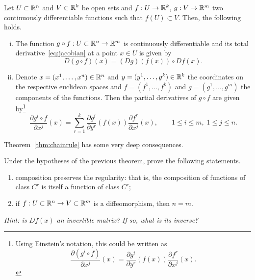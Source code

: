 \begin{theorem}\label{thm:chainrule}
  Let $U\subset\mathbb{R}^n$ and $V\subset\mathbb{R}^k$ be open sets and $f: U \to \mathbb{R}^k$, $g: V\to\mathbb{R}^m$ two continuously differentiable functions such that $f(U)\subset V$.
  Then, the following holds.
  \begin{enumerate}[(i)]
    \item\label{thm:chainrule1} The function $g\circ f: U\subset\mathbb{R}^n \to\mathbb{R}^m$ is continuously differentiable and its total derivative~\eqref{eq:jacobian} at a point $x\in U$ is given by
    \begin{equation}
      D(g\circ f)(x) = (Dg)(f(x)) \circ Df(x).
    \end{equation}
    \item\label{thm:chainrule2} Denote $x=(x^1, \ldots, x^n)\in\mathbb{R}^n$ and $y=(y^1,\ldots,y^k)\in\mathbb{R}^k$ the coordinates on the respective euclidean spaces and $f=(f^1,\ldots,f^k)$ and $g=(g^1,\ldots,g^m)$ the components of the functions. Then the partial derivatives of $g\circ f$ are given by\footnote{Using Einstein's notation, this could be written as \begin{equation}\frac{\partial (g^i\circ f)}{\partial x^j}(x) = \frac{\partial g^i}{\partial y^r}(f(x)) \frac{\partial f^r}{\partial x^j}(x).\end{equation}}
    \begin{equation}
      \frac{\partial g^i\circ f}{\partial x^j}(x)
      = \sum_{r=1}^k \frac{\partial g^i}{\partial y^r}(f(x)) \frac{\partial f^r}{\partial x^j}(x),
      \qquad 1\leq i \leq m,\; 1\leq j\leq n.
    \end{equation}
  \end{enumerate}
\end{theorem}

Theorem~\ref{thm:chainrule} has some very deep consequences.
\begin{exercise}
  Under the hypotheses of the previous theorem, prove the following statements.
  \begin{enumerate}
    \item composition preserves the regularity: that is, the composition of functions of class $C^r$ is itself a function of class $C^r$;
    \item if $f:U\subset\mathbb{R}^n\to V\subset\mathbb{R}^m$ is a diffeomorphism, then $n=m$.
  \end{enumerate}
  \textit{\small Hint: is $Df(x)$ an invertible matrix? If so, what is its inverse?} %
\end{exercise}

